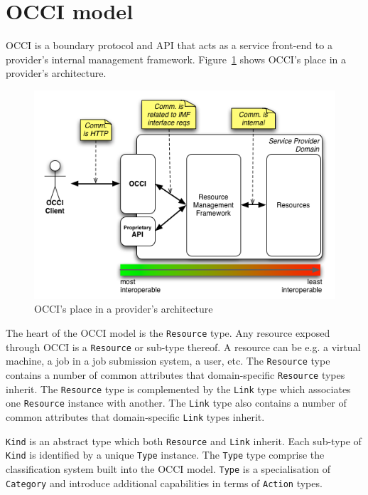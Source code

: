 \documentclass[10pt,a4paper,british]{article}
\newcommand{\hl}{\texttt}
\begin{document}
\section{OCCI model}
OCCI is a boundary protocol and API
that acts as a service front-end to a provider's internal management
framework. Figure~\ref{fig:placement} shows OCCI's place in a
provider's architecture.

\begin{figure}[!hp]
	\centering
	\includegraphics[scale=0.5]{figs/occi-intro.png}
	\caption{OCCI's place in a provider's architecture}
	\label{fig:placement}
\end{figure}

The heart of the OCCI model is the \hl{Resource} type. Any resource exposed
through OCCI is a \hl{Resource} or sub-type thereof.
A resource can be e.g. a virtual machine, a job in a job submission system, a
user, etc.
%
The \hl{Resource} type contains a number of common attributes that
domain-specific \hl{Resource} types inherit. The \hl{Resource} type is
complemented by the \hl{Link} type which associates one \hl{Resource} instance
with another.
%
The \hl{Link} type also contains a number of common attributes that
domain-specific \hl{Link} types inherit.

\hl{Kind} is an abstract type which both \hl{Resource} and \hl{Link} inherit.
Each sub-type of \hl{Kind} is identified by a unique \hl{Type} instance.
%
The \hl{Type} type comprise the classification system built into the OCCI
model. \hl{Type} is a specialisation of \hl{Category} and introduce additional
capabilities in terms of \hl{Action} types.
\end{document}
